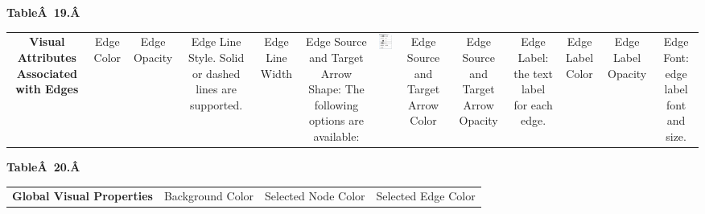  \textbf{Table\^A 19.\^A }



\begin{tabular}{|c|c|c|c|c|c|c|c|c|c|c|c|c|}
\hline 
 & & & & & & & & & & & & \\
 \hline 


 \textbf{Visual Attributes Associated with Edges}

 &

 Edge Color 
 &

 Edge Opacity 
 &

 Edge Line Style. Solid or dashed lines are supported.
 &

 Edge Line Width 
 &

 Edge Source and Target Arrow Shape: The following options are available: 
 &

 \includegraphics[width=.6\textwidth]{images/NewVizMapperArrowType.png} 
 &

 Edge Source and Target Arrow Color 
 &

 Edge Source and Target Arrow Opacity 
 &

 Edge Label: the text label for each edge. 
 &

 Edge Label Color 
 &

 Edge Label Opacity 
 &

 Edge Font: edge label font and size. 
 \\
 \hline 

\end{tabular}


 \textbf{Table\^A 20.\^A }



\begin{tabular}{|c|c|c|c|}
\hline 
 & & & \\
 \hline 


 \textbf{Global Visual Properties}

 &

 Background Color 
 &

 Selected Node Color 
 &

 Selected Edge Color 
 \\
 \hline 

\end{tabular}


